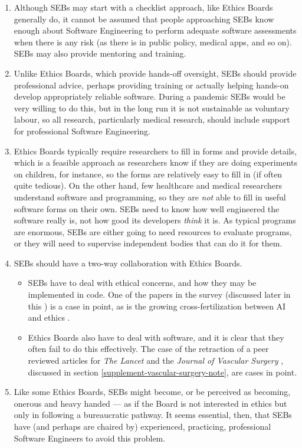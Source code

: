 \documentclass[10pt,a4paper]{article}
\begin{document}
\begin{enumerate}\raggedright
\item 
Although SEBs may start with a checklist approach, like Ethics Boards generally do, it cannot be assumed that people approaching SEBs know enough about Software Engineering to perform adequate software assessments when there is any risk (as there is in public policy, medical apps, and so on). SEBs may also provide mentoring and training.

\item
Unlike Ethics Boards, which provide hands-off oversight, SEBs should provide professional advice, perhaps providing training or actually helping hands-on develop appropriately reliable software. During a pandemic SEBs would be very willing to do this, but in the long run it is not sustainable as voluntary labour, so all research, particularly medical research, should include support for professional Software Engineering. 

\item 
Ethics Boards typically require researchers to fill in forms and provide details, which is a feasible approach as researchers know if they are doing experiments on children, for instance, so the forms are relatively easy to fill in (if often quite tedious). On the other hand, few healthcare and medical researchers understand software and programming, so they are \emph{not\/} able to fill in useful software forms on their own. SEBs need to know how well engineered the software really is, not how good its developers \emph{think\/} it is. As typical programs are enormous, SEBs are either going to need resources to evaluate programs, or they will need to supervise independent bodies that can do it for them. 

\item
SEBs should have a two-way collaboration with Ethics Boards. 

\begin{itemize}
\item SEBs have to deal with ethical concerns, and how they may be implemented in code. One of the papers \cite{ethics-paper} in the survey (discussed later in this \supplement) is a case in point, as is the growing cross-fertilization between AI and ethics .

\item Ethics Boards also have to deal with software, and it is clear that they often fail to do this effectively. The case of the retraction of a peer reviewed articles for \emph{The Lancet\/} \cite{science-lancet1,science-lancet2,lancet-learning} and the \emph{Journal of Vascular Surgery\/} \cite{jvs1,jvs2,jvs3}, discussed in section 
\ref{supplement-vascular-surgery-note}, are cases in point.
\end{itemize}

\item
Like some Ethics Boards, SEBs might become, or be perceived as becoming, onerous and heavy handed --- as if the Board is not interested in ethics but only in following a bureaucratic pathway. It seems essential, then, that SEBs have (and perhaps are chaired by) experienced, practicing, professional Software Engineers to avoid this problem. 
\end{enumerate}
\end{document}

